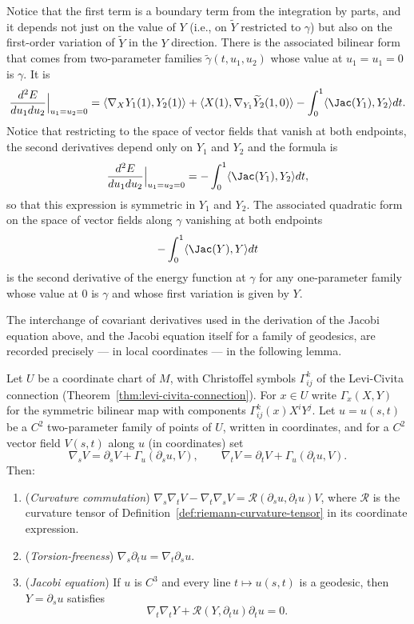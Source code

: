 Notice that the first term is a boundary term from the integration
by parts, and it depends not just on the value of $Y$ (i.e., on
$\widetilde Y$ restricted to $\gamma$) but also on the first-order
variation of $\widetilde Y$ in the $Y$ direction. There is the
associated bilinear form that comes from two-parameter families
$\tilde \gamma(t,u_1,u_2)$ whose value at $u_1=u_1=0$ is $\gamma$.
It is
$$\frac{d^2E}{du_1du_2}\Bigl|_{u_1=u_2=0}\Bigr.=\langle \nabla_XY_1(1),Y_2(1)\rangle+\langle
X(1),\nabla_{Y_1}\widetilde Y_2(1,0)\rangle-\int_0^1\langle \Jac(Y_1),Y_2\rangle dt.$$ Notice that restricting to the space of
vector fields that vanish at both endpoints, the second derivatives
depend only on $Y_1$ and $Y_2$ and the formula is
$$\frac{d^2E}{du_1du_2}\Bigl|_{u_1=u_2=0}\Bigr.=-\int_0^1\langle \Jac(Y_1),Y_2\rangle dt,$$
so that this expression is symmetric in $Y_1$ and $Y_2$. The
associated quadratic form on the space of vector fields along
$\gamma$ vanishing at both endpoints
$$-\int_0^1\langle \Jac(Y),Y\rangle dt$$
is the second derivative of the energy function at $\gamma$ for any
one-parameter family whose value at $0$ is $\gamma$ and whose first
variation is given by $Y$.

The interchange of covariant derivatives used in the derivation of
the Jacobi equation above, and the Jacobi equation itself for a
family of geodesics, are recorded precisely — in local coordinates —
in the following lemma.

\begin{lemma}
\label{lem:covariant-commutation-jacobi}
\leanok
Let $U$ be a coordinate chart of $M$, with Christoffel symbols
$\Gamma^k_{ij}$ of the Levi-Civita connection
(Theorem~\ref{thm:levi-civita-connection}). For $x\in U$ write
$\Gamma_x(X,Y)$ for the symmetric bilinear map with components
$\Gamma^k_{ij}(x)X^iY^j$. Let $u=u(s,t)$ be a $C^2$ two-parameter
family of points of $U$, written in coordinates, and for a $C^2$
vector field $V(s,t)$ along $u$ (in coordinates) set
$$\nabla_sV=\partial_sV+\Gamma_u(\partial_su,V),\qquad
\nabla_tV=\partial_tV+\Gamma_u(\partial_tu,V).$$
Then:
\begin{enumerate}
\item ({\em Curvature commutation})
$\nabla_s\nabla_tV-\nabla_t\nabla_sV
={\mathcal R}(\partial_su,\partial_tu)V$, where ${\mathcal R}$ is
the curvature tensor of
Definition~\ref{def:riemann-curvature-tensor} in its coordinate
expression.
\item ({\em Torsion-freeness})
$\nabla_s\partial_tu=\nabla_t\partial_su$.
\item ({\em Jacobi equation}) If $u$ is $C^3$ and every line
$t\mapsto u(s,t)$ is a geodesic, then $Y=\partial_su$ satisfies
$$\nabla_t\nabla_tY+{\mathcal R}(Y,\partial_tu)\partial_tu=0.$$
\end{enumerate}
\end{lemma}

